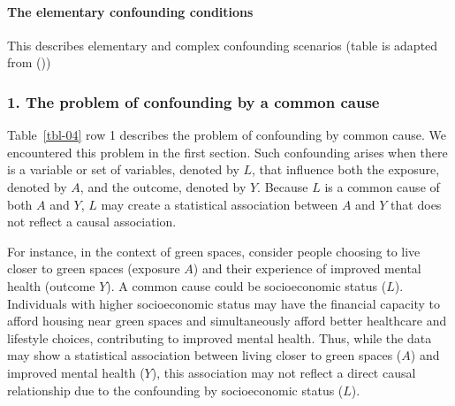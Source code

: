 \documentclass[
  singlecolumn]{article}
\let\oldparagraph\paragraph
\renewcommand{\paragraph}[1]{\oldparagraph{#1}\mbox{}}
\begin{document}
\paragraph{The elementary confounding
conditions}\label{the-elementary-confounding-conditions}

\begin{table}

\caption{\label{tbl-04}This describes elementary and complex confounding
scenarios (table is adapted from ())}

\centering{

\terminologyelconfoundersLONG

}

\end{table}%

\subsubsection{1. The problem of confounding by a common
cause}\label{the-problem-of-confounding-by-a-common-cause}

Table~\ref{tbl-04} row 1 describes the problem of confounding by common
cause. We encountered this problem in the first section. Such
confounding arises when there is a variable or set of variables, denoted
by \(L\), that influence both the exposure, denoted by \(A\), and the
outcome, denoted by \(Y.\) Because \(L\) is a common cause of both \(A\)
and \(Y\), \(L\) may create a statistical association between \(A\) and
\(Y\) that does not reflect a causal association.

For instance, in the context of green spaces, consider people choosing
to live closer to green spaces (exposure \(A\)) and their experience of
improved mental health (outcome \(Y\)). A common cause could be
socioeconomic status (\(L\)). Individuals with higher socioeconomic
status may have the financial capacity to afford housing near green
spaces and simultaneously afford better healthcare and lifestyle
choices, contributing to improved mental health. Thus, while the data
may show a statistical association between living closer to green spaces
(\(A\)) and improved mental health (\(Y\)), this association may not
reflect a direct causal relationship due to the confounding by
socioeconomic status (\(L\)).
\end{document}
